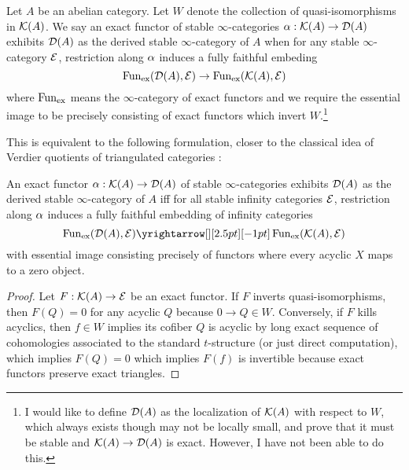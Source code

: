 \documentclass{article}
\begin{document}
\begin{dfn}\cite[Definition 1.3.4.1]{lurie-HA}
  Let $A$ be an abelian category.
  Let $W$ denote the collection of quasi-isomorphisms in $\mathcal{K}(A)$.
  We say an exact functor of stable $\infty$-categories 
  $\alpha : \mathcal{K}(A) \to \mathcal{D}(A)$
  exhibits $\mathcal{D}(A)$ as the derived stable $\infty$-category of $A$ when
  for any stable $\infty$-category $\mathcal{E}$,
  restriction along $\alpha$ induces a fully faithful embeding \[
    \operatorname{Fun}_{\mathrm{ex}}(\mathcal{D}(A) , \mathcal{E}) \to \operatorname{Fun}_{\mathrm{ex}}(\mathcal{K}(A) , \mathcal{E})
  \]
  where $\operatorname{Fun}_{\mathrm{ex}}$ means the $\infty$-category of exact functors
  and we require the essential image to be precisely
  consisting of exact functors which invert $W$.\footnote{
    I would like to define $\mathcal{D}(A)$ as the localization of $\mathcal{K}(A)$
    with respect to $W$, which always exists though may not be locally small,
    and prove that it must be stable and $\mathcal{K}(A) \to \mathcal{D}(A)$ is exact.
    However, I have not been able to do this.
  }
\end{dfn}
This is equivalent to the following formulation,
closer to the classical idea of Verdier quotients of triangulated categories : 
\begin{prop}
  An exact functor $\alpha : \mathcal{K}(A) \to \mathcal{D}(A)$ of stable $\infty$-categories
  exhibits $\mathcal{D}(A)$ as the derived stable $\infty$-category of $A$
  iff for all stable infinity categories $\mathcal{E}$,
  restriction along $\alpha$ induces 
  a fully faithful embedding of infinity categories \[
    \FUN_{\mathrm{ex}}(\cD(A), \cE) \map{}{}
    \FUN_{\mathrm{ex}}(\cK(A) , \cE)
  \]
  with essential image consisting precisely of 
  functors where every acyclic $X$ maps to a zero object.
\end{prop}
\begin{proof}
  Let $F : \mathcal{K}(A) \to \mathcal{E}$ be an exact functor.
  If $F$ inverts quasi-isomorphisms,
  then $F(Q) = 0$ for any acyclic $Q$ because $0 \to Q \in W$.
  Conversely, if $F$ kills acyclics,
  then $f \in W$ implies its cofiber $Q$ is acyclic by long exact
  sequence of cohomologies associated to the standard $t$-structure 
  (or just direct computation),
  which implies $F(Q) = 0$ which implies $F(f)$ is invertible
  because exact functors preserve exact triangles.
\end{proof}
\end{document}
